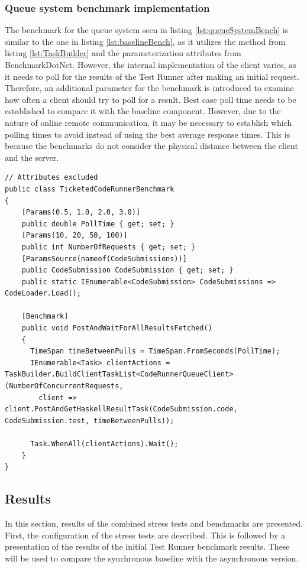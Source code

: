 \subsubsection{Queue system benchmark implementation}
The benchmark for the queue system seen in listing \ref{lst:queueSystemBench} is similar to the one in listing \ref{lst:baselineBench}, as it utilizes the method from listing \ref{lst:TaskBuilder} and the parameterization attributes from BenchmarkDotNet.
However, the internal implementation of the client varies, as it needs to poll for the results of the Test Runner after making an initial request.
Therefore, an additional parameter for the benchmark is introduced to examine how often a client should try to poll for a result.
Best case poll time needs to be established to compare it with the baseline component. 
However, due to the nature of online remote communication, it may be necessary to establish which polling times to avoid instead of using the best average response times.
This is because the benchmarks do not consider the physical distance between the client and the server.
\begin{lstlisting}[language=CSharp, escapechar=~, caption={C\# code showing the benchmark implementation for the asynchronous backend}, label={lst:queueSystemBench}]
// Attributes excluded
public class TicketedCodeRunnerBenchmark
{
    [Params(0.5, 1.0, 2.0, 3.0)] 
    public double PollTime { get; set; }
    [Params(10, 20, 50, 100)] 
    public int NumberOfRequests { get; set; }
    [ParamsSource(nameof(CodeSubmissions))] 
    public CodeSubmission CodeSubmission { get; set; }
    public static IEnumerable<CodeSubmission> CodeSubmissions => CodeLoader.Load();

    [Benchmark]
    public void PostAndWaitForAllResultsFetched()
    {
      TimeSpan timeBetweenPulls = TimeSpan.FromSeconds(PollTime);
      IEnumerable<Task> clientActions = TaskBuilder.BuildClientTaskList<CodeRunnerQueueClient>(NumberOfConcurrentRequests, 
        client => client.PostAndGetHaskellResultTask(CodeSubmission.code, CodeSubmission.test, timeBetweenPulls));

      Task.WhenAll(clientActions).Wait();
    }
}
\end{lstlisting}

\subsection{Results}
In this section, results of the combined stress tests and benchmarks are presented.
First, the configuration of the stress tests are described.
This is followed by a presentation of the results of the initial Test Runner benchmark results.
These will be used to compare the synchronous baseline with the asynchronous version.

